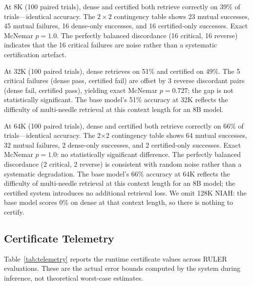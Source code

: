 \documentclass[10pt,twocolumn,a4paper]{article}
\theoremstyle{definition}
\theoremstyle{remark}
\begin{document}
At 8K (100 paired trials), dense and certified both retrieve correctly on 39\% of trials---identical accuracy.  The $2\times 2$ contingency table shows 23 mutual successes, 45 mutual failures, 16 dense-only successes, and 16 certified-only successes.  Exact McNemar $p{=}1.0$.  The perfectly balanced discordance (16 critical, 16 reverse) indicates that the 16 critical failures are noise rather than a systematic certification artefact.

At 32K (100 paired trials), dense retrieves on 51\% and certified on 49\%.  The 5 critical failures (dense pass, certified fail) are offset by 3 reverse discordant pairs (dense fail, certified pass), yielding exact McNemar $p{=}0.727$; the gap is not statistically significant.  The base model's 51\% accuracy at 32K reflects the difficulty of multi-needle retrieval at this context length for an 8B model.

At 64K (100 paired trials), dense and certified both retrieve correctly on 66\% of trials---identical accuracy.  The 2$\times$2 contingency table shows 64 mutual successes, 32 mutual failures, 2 dense-only successes, and 2 certified-only successes.  Exact McNemar $p{=}1.0$: no statistically significant difference.  The perfectly balanced discordance (2 critical, 2 reverse) is consistent with random noise rather than a systematic degradation.  The base model's 66\% accuracy at 64K reflects the difficulty of multi-needle retrieval at this context length for an 8B model; the certified system introduces no additional retrieval loss.  We omit 128K NIAH: the base model scores 0\% on dense at that context length, so there is nothing to certify.

\subsection{Certificate Telemetry}
\label{sec:telemetry}

Table~\ref{tab:telemetry} reports the runtime certificate values across RULER evaluations.  These are the actual error bounds computed by the system during inference, not theoretical worst-case estimates.
\end{document}

